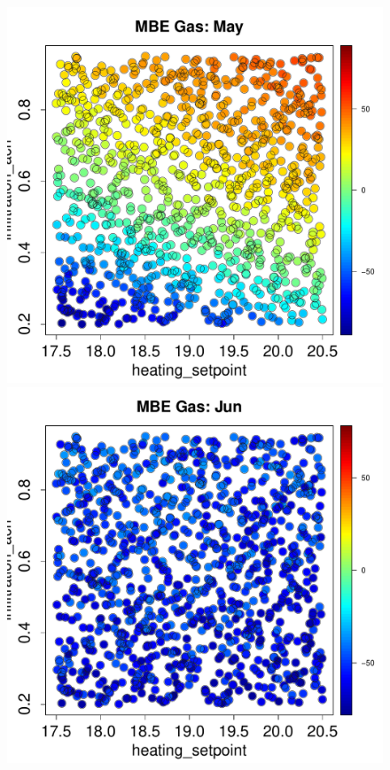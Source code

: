 \documentclass[a4paper, 12pt]{article}
\begin{document}
\begin{figure}
 \includegraphics[width=\scale]{MBE/MBE_Gas_05.pdf}
 \includegraphics[width=\scale]{MBE/MBE_Gas_06.pdf}\\

\end{figure}
\end{document}
